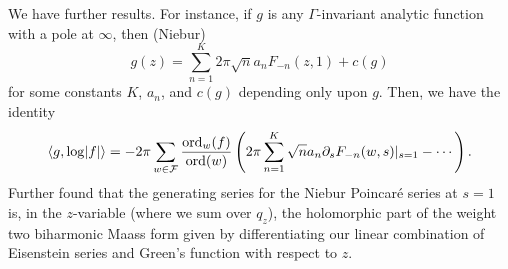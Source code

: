 \documentclass[reqno]{amsart} 
\begin{document}
We have further results.  For instance, if $g$ is any $\Gamma$-invariant analytic function with a pole at $\infty$, then (Niebur)
\begin{equation*}
  g(z) = \sum_{n = 1}^K 2 \pi \sqrt{n} a_n F_{- n}(z, 1) + c(g)
\end{equation*}
for some constants $K$, $a_n$, and $c(g)$ depending only upon $g$.  Then, we have the identity
\begin{equation*}
  \left\langle g, \log \lvert f \rvert \right\rangle
  = - 2 \pi \sum_{w \in \mathcal{F}} \frac{\operatorname{ord}_w(f)}{\operatorname{ord}(w)}
  \left( 2 \pi \sum_{n = 1}^K \sqrt{n } a_n \partial_s F_{- n}(w, s) |_{s=1} - \dotsb \right).
\end{equation*}
Further found that the generating series for the Niebur Poincar{\'e} series at $s = 1$ is, in the $z$-variable (where we sum over $q_z$), the holomorphic part of the weight two biharmonic Maass form given by differentiating our linear combination of Eisenstein series and Green's function with respect to $z$.















{} 
\end{document}
